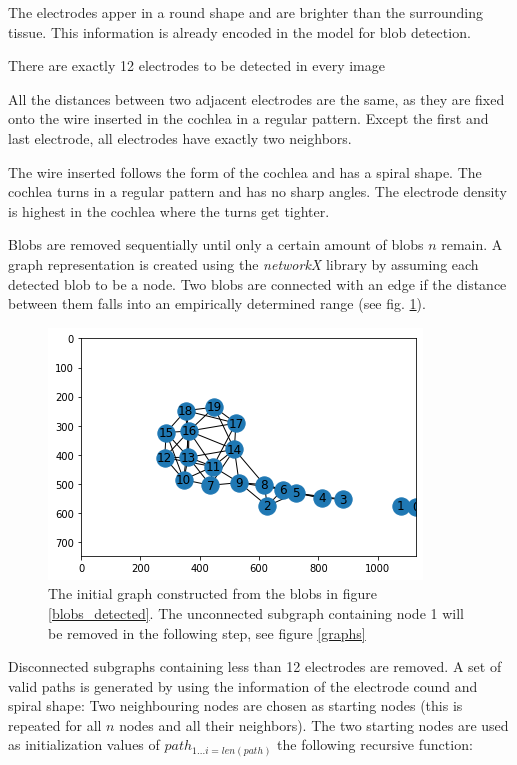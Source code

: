 \documentclass[a4paper, 11pt]{article}
\begin{document}
\begin{description}[] %
\item[Electrode shape and intensity] The electrodes apper in a round shape and are brighter than the surrounding tissue. This information is already encoded in the model for blob detection.
\item[Electrode count] There are exactly 12 electrodes to be detected in every image
\item[Equidistance] All the distances between two adjacent electrodes are the same, as they are fixed onto the wire inserted in the cochlea in a regular pattern. Except the first and last electrode, all electrodes have exactly two neighbors. 
\item[Spiral shape] The wire inserted follows the form of the cochlea and has a spiral shape. The cochlea turns in a regular pattern and has no sharp angles. The electrode density is highest in the cochlea where the turns get tighter.
\end{description}
Blobs are removed sequentially until only a certain amount of blobs $n$ remain. %
A graph representation is created using the \emph{networkX} library \cite{networkx} by assuming each detected blob to be a node. Two blobs are connected with an edge if the distance between them falls into an empirically determined range (see fig. \ref{network_raw}). %

\begin{figure}[ht]
	\centering
  \includegraphics[width=.5\textwidth]{network_raw.png}
	\caption{The initial graph constructed from the blobs in figure \ref{blobs_detected}. The unconnected subgraph containing node 1 will be removed in the following step, see figure \ref{graphs}}
	\label{network_raw}
\end{figure}

Disconnected subgraphs containing less than 12 electrodes are removed.
A set of valid paths is generated by using the information of the electrode cound and spiral shape: Two neighbouring nodes are chosen as starting nodes (this is repeated for all $n$ nodes and all their neighbors). The two starting nodes are used as initialization values of $path_{1...i = len(path)} $ the following recursive function:
\end{document}
